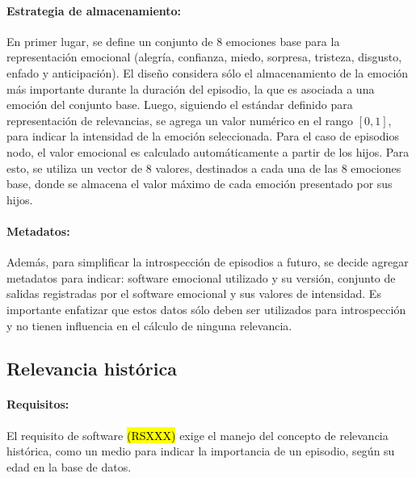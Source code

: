 \paragraph{Estrategia de almacenamiento:}
En primer lugar, se define un conjunto de 8 emociones base para la representación emocional (alegría, confianza, miedo, sorpresa, tristeza, disgusto, enfado y anticipación). El diseño considera sólo el almacenamiento de la emoción más importante durante la duración del episodio, la que es asociada a una emoción del conjunto base. Luego, siguiendo el estándar definido para representación de relevancias, se agrega un valor numérico en el rango $[0, 1]$, para  indicar la intensidad de la emoción seleccionada. Para el caso de episodios nodo, el valor emocional es calculado automáticamente a partir de los hijos. Para esto, se utiliza un vector de 8 valores, destinados a cada una de las 8 emociones base, donde se almacena el valor máximo de cada emoción presentado por sus hijos.

\paragraph{Metadatos:}
Además, para simplificar la introspección de episodios a futuro, se decide agregar metadatos para indicar: software emocional utilizado y su versión, conjunto de salidas registradas por el software emocional y sus valores de intensidad. Es importante enfatizar que estos datos sólo deben ser utilizados para introspección y no tienen influencia en el cálculo de ninguna relevancia.


\subsection{Relevancia histórica}

\paragraph{Requisitos:}
El requisito de software \hl{(RSXXX)} exige el manejo del concepto de relevancia histórica, como un medio para indicar la importancia de un episodio, según su edad en la base de datos. 

